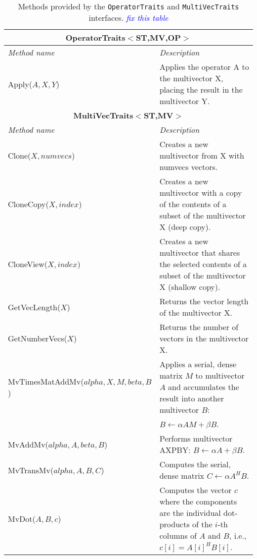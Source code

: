 \documentclass[acmtoms]{acmtrans2m}
\newcommand{\aspace}[1]{\texttt{#1}}
\newcommand{\cbcomm}[1]{\textcolor{blue}{\emph{#1}}}
\begin{document}
\begin{table}
\begin{center}
  \caption{Methods provided by the \aspace{OperatorTraits} and
  \aspace{MultiVecTraits} interfaces. \cbcomm{fix this table}}
\label{tab:anasazi:mvt}
\begin{tabular}{| p{4cm} | p{8cm} |}
\hline
\multicolumn{2}{|c|}{\textbf{OperatorTraits$<$ST,MV,OP$>$}} \\\hline
\emph{Method name} & \emph{Description} \\\hline
Apply($A,X,Y$) & Applies the operator A to the multivector X, placing the
result in the multivector Y. \\\hline\hline
\multicolumn{2}{|c|}{\textbf{MultiVecTraits$<$ST,MV$>$}} \\\hline
\emph{Method name} & \emph{Description} \\\hline
Clone($X,numvecs$)           & Creates a new multivector from X with
numvecs vectors.  \\\hline

CloneCopy($X,index$) & Creates a new multivector with a copy of the contents of
a subset of the multivector X (deep copy). \\\hline

CloneView($X,index$) & Creates a new multivector that shares the selected
contents of a subset of the multivector X (shallow copy).  \\\hline

GetVecLength($X$) & Returns the vector length of the multivector X.
\\\hline

GetNumberVecs($X$)& Returns the number of vectors in the multivector X.
\\\hline

MvTimesMatAddMv($alpha,X,M,beta,B$) & Applies a serial, dense matrix $M$ to
multivector $A$ and accumulates the result into another multivector $B$:\\
& $B \leftarrow \alpha A M + \beta B$.
\\\hline

MvAddMv($alpha,A,beta,B$)  & Performs multivector AXPBY: $ B \leftarrow \alpha A + \beta B$.
\\\hline

MvTransMv($alpha,A,B,C$) & Computes the serial, dense matrix $C \leftarrow \alpha A^H B$.
\\\hline

MvDot($A,B,c$) & Computes the vector $c$ where the components are the
individual dot-products of the $i$-th columns of $A$ and $B$, i.e.,
$c[i] = A[i]^H B[i]$.  \\\hline


\end{tabular}
\end{center}
\end{table}
\end{document}
